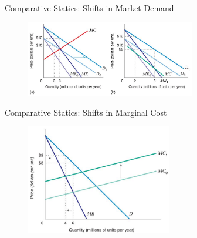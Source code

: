 \documentclass[11pt,t]{beamer}
\begin{document}








\begin{frame}{Comparative Statics: Shifts in Market Demand}
  \begin{figure}
    \includegraphics[width=280px]{figures/fig11_10.jpg}
  \end{figure}
\end{frame}






\begin{frame}{Comparative Statics: Shifts in Marginal Cost}
  \begin{figure}
    \includegraphics[width=240px]{figures/fig11_12.jpg}
  \end{figure}
\end{frame}
\end{document}
